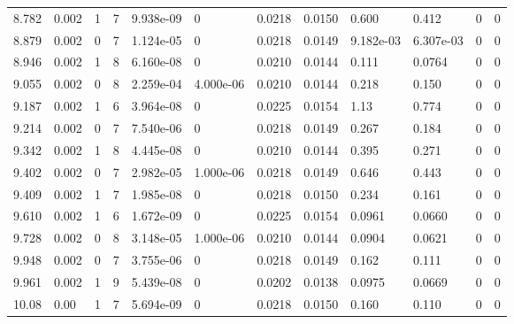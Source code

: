 \documentclass[preview]{standalone}
\begin{document}
{{{\begin{tabular}{L{1.2cm}C{1.2cm} C{0.3cm}C{0.5cm} C{1.4cm}C{1.4cm} C{1.4cm}C{1.4cm} C{1.6cm}C{1.6cm} C{1.6cm}C{1.6cm}}
  8.782  &  0.002  & 1     &  7 &  9.938e-09  & 0  &  0.0218&   0.0150& 0.600 & 0.412   &  0 & 0  \\ 
  8.879  &  0.002  & 0     &  7 &  1.124e-05  & 0  &  0.0218&   0.0149& 9.182e-03 & 6.307e-03   &  0 & 0  \\ 
  8.946  &  0.002  & 1     &  8 &  6.160e-08  & 0  &  0.0210&   0.0144& 0.111 & 0.0764   &  0 & 0  \\ 
  9.055  &  0.002  & 0     &  8 &  2.259e-04  & 4.000e-06  &  0.0210&   0.0144& 0.218 & 0.150   &  0 & 0  \\ 
  9.187  &  0.002  & 1     &  6 &  3.964e-08  & 0  &  0.0225&   0.0154& 1.13 & 0.774   &  0 & 0  \\ 
  9.214  &  0.002  & 0     &  7 &  7.540e-06  & 0  &  0.0218&   0.0149& 0.267 & 0.184   &  0 & 0  \\ 
  9.342  &  0.002  & 1     &  8 &  4.445e-08  & 0  &  0.0210&   0.0144& 0.395 & 0.271   &  0 & 0  \\ 
  9.402  &  0.002  & 0     &  7 &  2.982e-05  & 1.000e-06  &  0.0218&   0.0149& 0.646 & 0.443   &  0 & 0  \\ 
  9.409  &  0.002  & 1     &  7 &  1.985e-08  & 0  &  0.0218&   0.0150& 0.234 & 0.161   &  0 & 0  \\ 
  9.610  &  0.002  & 1     &  6 &  1.672e-09  & 0  &  0.0225&   0.0154& 0.0961 & 0.0660   &  0 & 0  \\ 
  9.728  &  0.002  & 0     &  8 &  3.148e-05  & 1.000e-06  &  0.0210&   0.0144& 0.0904 & 0.0621   &  0 & 0  \\ 
  9.948  &  0.002  & 0     &  7 &  3.755e-06  & 0  &  0.0218&   0.0149& 0.162 & 0.111   &  0 & 0  \\ 
  9.961  &  0.002  & 1     &  9 &  5.439e-08  & 0  &  0.0202&   0.0138& 0.0975 & 0.0669   &  0 & 0  \\ 
  10.08  &  0.00  & 1     &  7 &  5.694e-09  & 0  &  0.0218&   0.0150& 0.160 & 0.110   &  0 & 0  \\ 
\hline 
\end{tabular} 

}}}
\end{document}
